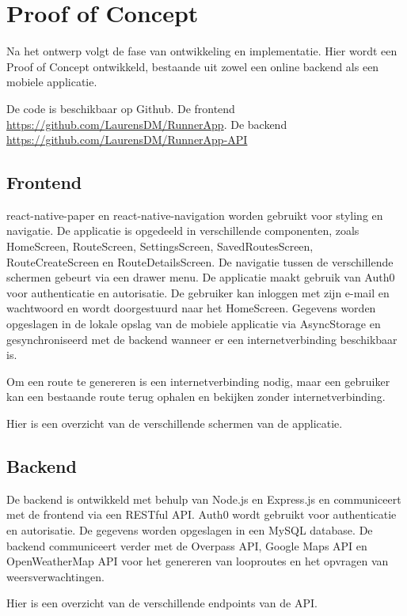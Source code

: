     \section{Proof of Concept}

    Na het ontwerp volgt de fase van ontwikkeling en implementatie. Hier wordt een Proof of Concept ontwikkeld, 
    bestaande uit zowel een online backend als een mobiele applicatie.

    De code is beschikbaar op Github. De frontend \url{https://github.com/LaurensDM/RunnerApp}.
    De backend \url{https://github.com/LaurensDM/RunnerApp-API}

    \subsection{Frontend}

    react-native-paper en react-native-navigation worden gebruikt voor styling en navigatie. De applicatie is opgedeeld in verschillende componenten, zoals HomeScreen, RouteScreen, SettingsScreen, SavedRoutesScreen, RouteCreateScreen en RouteDetailsScreen. De navigatie tussen de verschillende schermen gebeurt via een drawer menu. De applicatie maakt gebruik van Auth0 voor authenticatie en autorisatie. De gebruiker kan inloggen met zijn e-mail en wachtwoord en wordt doorgestuurd naar het HomeScreen. Gegevens worden opgeslagen in de lokale opslag van de mobiele applicatie via AsyncStorage en gesynchroniseerd met de backend wanneer er een internetverbinding beschikbaar is.

    Om een route te genereren is een internetverbinding nodig, maar een gebruiker kan een bestaande route terug ophalen en bekijken zonder internetverbinding.
    
    Hier is een overzicht van de verschillende schermen van de applicatie.
    
    \subsection{Backend}
    
    De backend is ontwikkeld met behulp van Node.js en Express.js en communiceert met de frontend via een RESTful API. Auth0 wordt gebruikt voor authenticatie en autorisatie. De gegevens worden opgeslagen in een MySQL database. De backend communiceert verder met de Overpass API, Google Maps API en OpenWeatherMap API voor het genereren van looproutes en het opvragen van weersverwachtingen.
    
    Hier is een overzicht van de verschillende endpoints van de API.
    
